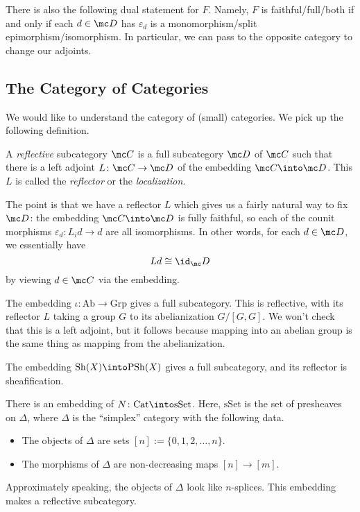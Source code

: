 \begin{remark}
	There is also the following dual statement for $F$. Namely, $F$ is faithful/full/both if and only if each $d\in\mc D$ has $\varepsilon_d$ is a monomorphism/split epimorphism/isomorphism. In particular, we can pass to the opposite category to change our adjoints.
\end{remark}

\subsection{The Category of Categories}
We would like to understand the category of (small) categories. We pick up the following definition.
\begin{definition}
	A \textit{reflective} subcategory $\mc C$ is a full subcategory $\mc D$ of $\mc C$ such that there is a left adjoint $L\colon\mc C\to\mc D$ of the embedding $\mc C\into\mc D$. This $L$ is called the \textit{reflector} or the \textit{localization}.
\end{definition}
The point is that we have a reflector $L$ which gives us a fairly natural way to fix $\mc D$: the embedding $\mc C\into\mc D$ is fully faithful, so each of the counit morphisms $\varepsilon_d\colon L_id\to d$ are all isomorphisms. In other words, for each $d\in\mc D$, we essentially have
\[Ld\cong\id_\mc D\]
by viewing $d\in\mc C$ via the embedding.
\begin{example}
	The embedding $\iota\colon\mathrm{Ab}\to\mathrm{Grp}$ gives a full subcategory. This is reflective, with its reflector $L$ taking a group $G$ to its abelianization $G/[G,G]$. We won't check that this is a left adjoint, but it follows because mapping into an abelian group is the same thing as mapping from the abelianization.
\end{example}
\begin{example}
	The embedding $\mathrm{Sh}(X)\into\mathrm{PSh}(X)$ gives a full subcategory, and its reflector is sheafification.
\end{example}
\begin{exe}
	There is an embedding of $N\colon\mathrm{Cat}\into\mathrm{sSet}$. Here, $\mathrm{sSet}$ is the set of presheaves on $\Delta$, where $\Delta$ is the ``simplex'' category with the following data.
	\begin{itemize}
		\item The objects of $\Delta$ are sets $[n]:=\{0,1,2,\ldots,n\}$.
		\item The morphisms of $\Delta$ are non-decreasing maps $[n]\to[m]$.
	\end{itemize}
	Approximately speaking, the objects of $\Delta$ look like $n$-splices. This embedding makes a reflective subcategory.
\end{exe}
